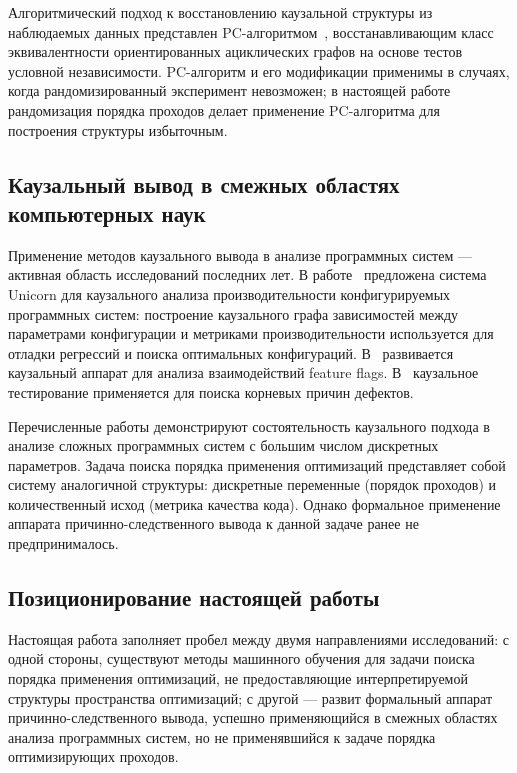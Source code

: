 Алгоритмический подход к восстановлению каузальной структуры из наблюдаемых данных представлен PC-алгоритмом~\cite{spirtes2000causation}, восстанавливающим класс эквивалентности ориентированных ациклических графов на основе тестов условной независимости. PC-алгоритм и его модификации применимы в случаях, когда рандомизированный эксперимент невозможен; в настоящей работе рандомизация порядка проходов делает применение PC-алгоритма для построения структуры избыточным.

\subsection{Каузальный вывод в смежных областях компьютерных наук}

Применение методов каузального вывода в анализе программных систем --- активная область исследований последних лет. В работе~\cite{iqbal2022unicorn} предложена система Unicorn для каузального анализа производительности конфигурируемых программных систем: построение каузального графа зависимостей между параметрами конфигурации и метриками производительности используется для отладки регрессий и поиска оптимальных конфигураций. В~\cite{dubslaff2022causality} развивается каузальный аппарат для анализа взаимодействий feature flags. В~\cite{johnson2020causal} каузальное тестирование применяется для поиска корневых причин дефектов.

Перечисленные работы демонстрируют состоятельность каузального подхода в анализе сложных программных систем с большим числом дискретных параметров. Задача поиска порядка применения оптимизаций представляет собой систему аналогичной структуры: дискретные переменные (порядок проходов) и количественный исход (метрика качества кода). Однако формальное применение аппарата причинно-следственного вывода к данной задаче ранее не предпринималось.

\subsection{Позиционирование настоящей работы}

Настоящая работа заполняет пробел между двумя направлениями исследований: с одной стороны, существуют методы машинного обучения для задачи поиска порядка применения оптимизаций, не предоставляющие интерпретируемой структуры пространства оптимизаций; с другой --- развит формальный аппарат причинно-следственного вывода, успешно применяющийся в смежных областях анализа программных систем, но не применявшийся к задаче порядка оптимизирующих проходов.

